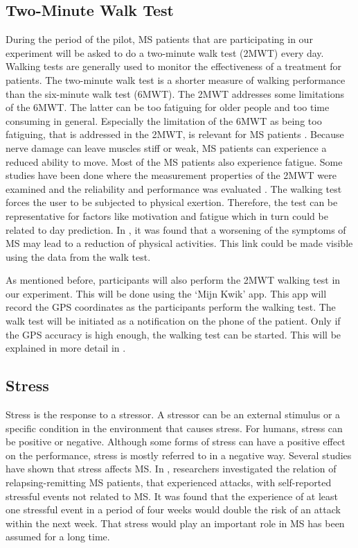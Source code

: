 \subsection{Two-Minute Walk Test}
During the period of the pilot, MS patients that are participating in our experiment will be asked to do a two-minute walk test (2MWT) every day.
Walking tests are generally used to monitor the effectiveness of a treatment for patients.
The two-minute walk test is a shorter measure of walking performance than the six-minute walk test (6MWT). 
The 2MWT addresses some limitations of the 6MWT.
The latter can be too fatiguing for older people and too time consuming in general.
Especially the limitation of the 6MWT as being too fatiguing, that is addressed in the 2MWT, is relevant for MS patients \cite{gijbels2011comparison}.
Because nerve damage can leave muscles stiff or weak, MS patients can experience a reduced ability to move.
Most of the MS patients also experience fatigue.
Some studies have been done where the measurement properties of the 2MWT were examined \cite{connelly2009clinical} and the reliability and performance was evaluated \cite{bohannon2015two}.
The walking test forces the user to be subjected to physical exertion. 
Therefore, the test can be representative for factors like motivation and fatigue which in turn could be related to day prediction.
In \cite{motl2008worsening}, it was found that a worsening of the symptoms of MS may lead to a reduction of physical activities.
This link could be made visible using the data from the walk test.

As mentioned before, participants will also perform the 2MWT walking test in our experiment.
This will be done using the `Mijn Kwik' app.
This app will record the GPS coordinates as the participants perform the walking test.
The walk test will be initiated as a notification on the phone of the patient.
Only if the GPS accuracy is high enough, the walking test can be started.
This will be explained in more detail in .

\subsection{Stress} \label{subsection: Stress}
Stress is the response to a stressor. 
A stressor can be an external stimulus or a specific condition in the environment that causes stress.
For humans, stress can be positive or negative. 
Although some forms of stress can have a positive effect on the performance, stress is mostly referred to in a negative way.
Several studies have shown that stress affects MS.
In \cite{buljevac2003self}, researchers investigated the relation of relapsing-remitting MS patients, that experienced attacks, with self-reported stressful events not related to MS.
It was found that the experience of at least one stressful event in a period of four weeks would double the risk of an attack within the next week.
That stress would play an important role in MS has been assumed for a long time.

